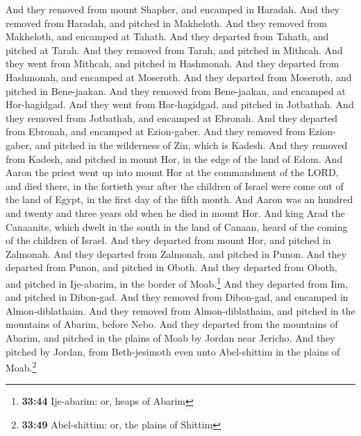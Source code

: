  And they removed from mount Shapher, and encamped in
Haradah.  And they removed from Haradah, and pitched in
Makheloth.  And they removed from Makheloth, and encamped
at Tahath.  And they departed from Tahath, and pitched at
Tarah.  And they removed from Tarah, and pitched in
Mithcah.  And they went from Mithcah, and pitched in
Hashmonah.  And they departed from Hashmonah, and
encamped at Moseroth.  And they departed from Moseroth,
and pitched in Bene-jaakan.  And they removed from
Bene-jaakan, and encamped at Hor-hagidgad.  And they went
from Hor-hagidgad, and pitched in Jotbathah.  And they
removed from Jotbathah, and encamped at Ebronah.  And
they departed from Ebronah, and encamped at Ezion-gaber. 
And they removed from Ezion-gaber, and pitched in the wilderness of Zin,
which is Kadesh.  And they removed from Kadesh, and
pitched in mount Hor, in the edge of the land of Edom. 
And Aaron the priest went up into mount Hor at the commandment of the
LORD, and died there, in the fortieth year after the children of Israel
were come out of the land of Egypt, in the first day of the fifth month.
 And Aaron was an hundred and twenty and three years old
when he died in mount Hor.  And king Arad the Canaanite,
which dwelt in the south in the land of Canaan, heard of the coming of
the children of Israel.  And they departed from mount
Hor, and pitched in Zalmonah.  And they departed from
Zalmonah, and pitched in Punon.  And they departed from
Punon, and pitched in Oboth.  And they departed from
Oboth, and pitched in Ije-abarim, in the border of Moab.\footnote{\textbf{33:44}
  Ije-abarim: or, heaps of Abarim}  And they departed
from Iim, and pitched in Dibon-gad.  And they removed
from Dibon-gad, and encamped in Almon-diblathaim.  And
they removed from Almon-diblathaim, and pitched in the mountains of
Abarim, before Nebo.  And they departed from the
mountains of Abarim, and pitched in the plains of Moab by Jordan near
Jericho.  And they pitched by Jordan, from Beth-jesimoth
even unto Abel-shittim in the plains of Moab.\footnote{\textbf{33:49}
  Abel-shittim: or, the plains of Shittim}

